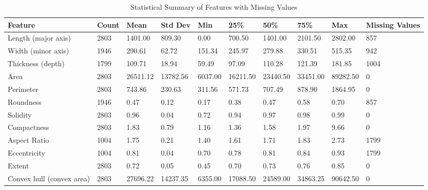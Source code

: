 \documentclass[conference]{IEEEtran}
\begin{document}
\begin{table}[h]
    \centering
    \caption{Statistical Summary of Features with Missing Values}
    \label{tab:dataset_stats}
    \begin{tabularx}{\textwidth}{@{}lXXXXXXXXX@{}}
        \toprule
        Feature & Count & Mean & Std Dev & Min & 25\% & 50\% & 75\% & Max & Missing Values \\ 
        \midrule
        Length (major axis)        & 2803   & 1401.00   & 809.30   & 0.00      & 700.50     & 1401.00   & 2101.50   & 2802.00 & 857 \\
        Width (minor axis)        & 1946   & 290.61    & 62.72    & 151.34    & 245.97    & 279.88    & 330.51    & 515.35 & 942 \\
        Thickness (depth)         & 1799   & 109.71    & 18.94    & 59.49     & 97.09     & 110.28    & 121.39    & 181.85 & 1004 \\
        Area                       & 2803   & 26511.12  & 13782.56 & 6037.00   & 16211.50  & 23440.50  & 33451.00  & 89282.50 & 0 \\
        Perimeter                  & 2803   & 743.86    & 230.63   & 311.56    & 571.73    & 707.49    & 878.90    & 1864.95 & 0 \\
        Roundness                  & 1946   & 0.47      & 0.12     & 0.17      & 0.38      & 0.47      & 0.58      & 0.70 & 857 \\
        Solidity                   & 2803   & 0.96      & 0.04     & 0.72      & 0.94      & 0.97      & 0.98      & 0.99 & 0 \\
        Compactness                & 2803   & 1.83      & 0.79     & 1.16      & 1.36      & 1.58      & 1.97      & 9.66 & 0 \\
        Aspect Ratio               & 1004   & 1.75      & 0.21     & 1.40      & 1.61      & 1.71      & 1.83      & 2.73 & 1799 \\
        Eccentricity               & 1004   & 0.81      & 0.04     & 0.70      & 0.78      & 0.81      & 0.84      & 0.93 & 1799 \\
        Extent                     & 2803   & 0.72      & 0.05     & 0.45      & 0.70      & 0.73      & 0.76      & 0.85 & 0 \\
        Convex hull (convex area) & 2803   & 27696.22  & 14237.35 & 6355.00   & 17088.50  & 24589.00  & 34863.25  & 90642.50 & 0 \\ 
        \bottomrule
    \end{tabularx}
\end{table}
\end{document}
